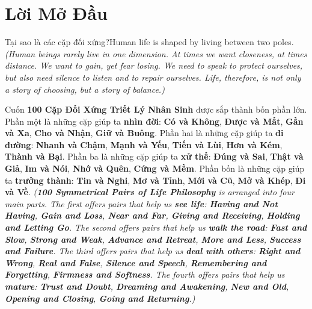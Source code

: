 \chapter*{Lời Mở Đầu}

\begin{truyen}{Tại sao là các cặp đối xứng?}{Human life is shaped by living between two poles.}
\textit{(Human beings rarely live in one dimension. At times we want closeness, at times distance. We want to gain, yet fear losing. We need to speak to protect ourselves, but also need silence to listen and to repair ourselves. Life, therefore, is not only a story of choosing, but a story of balance.)}

Cuốn \textbf{100 Cặp Đối Xứng Triết Lý Nhân Sinh} được sắp thành bốn phần lớn. Phần một là những cặp giúp ta \textbf{nhìn đời}: \textbf{Có và Không}, \textbf{Được và Mất}, \textbf{Gần và Xa}, \textbf{Cho và Nhận}, \textbf{Giữ và Buông}. Phần hai là những cặp giúp ta \textbf{đi đường}: \textbf{Nhanh và Chậm}, \textbf{Mạnh và Yếu}, \textbf{Tiến và Lùi}, \textbf{Hơn và Kém}, \textbf{Thành và Bại}. Phần ba là những cặp giúp ta \textbf{xử thế}: \textbf{Đúng và Sai}, \textbf{Thật và Giả}, \textbf{Im và Nói}, \textbf{Nhớ và Quên}, \textbf{Cứng và Mềm}. Phần bốn là những cặp giúp ta \textbf{trưởng thành}: \textbf{Tin và Nghi}, \textbf{Mơ và Tỉnh}, \textbf{Mới và Cũ}, \textbf{Mở và Khép}, \textbf{Đi và Về}.
\textit{(\textbf{100 Symmetrical Pairs of Life Philosophy} is arranged into four main parts. The first offers pairs that help us \textbf{see life}: \textbf{Having and Not Having}, \textbf{Gain and Loss}, \textbf{Near and Far}, \textbf{Giving and Receiving}, \textbf{Holding and Letting Go}. The second offers pairs that help us \textbf{walk the road}: \textbf{Fast and Slow}, \textbf{Strong and Weak}, \textbf{Advance and Retreat}, \textbf{More and Less}, \textbf{Success and Failure}. The third offers pairs that help us \textbf{deal with others}: \textbf{Right and Wrong}, \textbf{Real and False}, \textbf{Silence and Speech}, \textbf{Remembering and Forgetting}, \textbf{Firmness and Softness}. The fourth offers pairs that help us \textbf{mature}: \textbf{Trust and Doubt}, \textbf{Dreaming and Awakening}, \textbf{New and Old}, \textbf{Opening and Closing}, \textbf{Going and Returning}.)}


\end{truyen}
